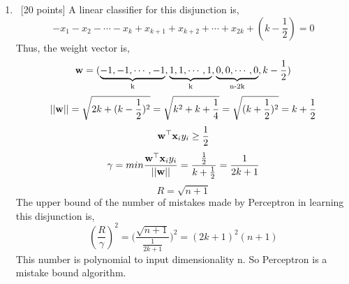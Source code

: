 \documentclass[12pt, fullpage,letterpaper]{article}
\newcommand{\bx}{{\bf x}}
\newcommand{\bw}{{\bf w}}
\begin{document}
\begin{enumerate}
\item~[20 points]
A linear classifier for this disjunction is,
$$-x_1-x_2-\cdots-x_k+x_{k+1}+x_{k+2}+\cdots+x_{2k}+(k-\frac{1}{2})=0$$
Thus, the weight vector is,
$$\bw=(\underbrace{-1,-1,\cdots,-1}_\text{k},\underbrace{1,1,\cdots,1}_\text{k},\underbrace{0,0,\cdots,0}_\text{n-2k},k-\frac{1}{2})$$
$$||\bw||=\sqrt{2k+(k-\frac{1}{2})^2}=\sqrt{k^2+k+\frac{1}{4}}=\sqrt{(k+\frac{1}{2})^2}=k+\frac{1}{2}$$
$$\bw^\top\bx_iy_i\ge \frac{1}{2}$$
$$\gamma=min\frac{\bw^\top\bx_iy_i}{||\bw||}=\frac{\frac{1}{2}}{k+\frac{1}{2}}=\frac{1}{2k+1}$$
$$R=\sqrt{n+1}$$
The upper bound of the number of mistakes made by Perceptron in learning
this disjunction is,
$$(\frac{R}{\gamma})^2=\Big(\frac{\sqrt{n+1}}{\frac{1}{2k+1}}\Big)^2=(2k+1)^2(n+1)$$
This number is polynomial to input dimensionality n. So Perceptron is a mistake bound algorithm.
\end{enumerate}
\end{document}
